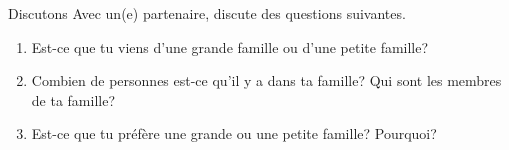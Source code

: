 \begin{frame}{Discutons}
  Avec un(e) partenaire, discute des questions suivantes.
  \begin{enumerate}
    \item Est-ce que tu viens d'une grande famille ou d'une petite famille? 
    \item Combien de personnes est-ce qu'il y a dans ta famille? Qui sont les membres de ta famille?
    \item Est-ce que tu préfère une grande ou une petite famille? Pourquoi?
  \end{enumerate}
\end{frame}